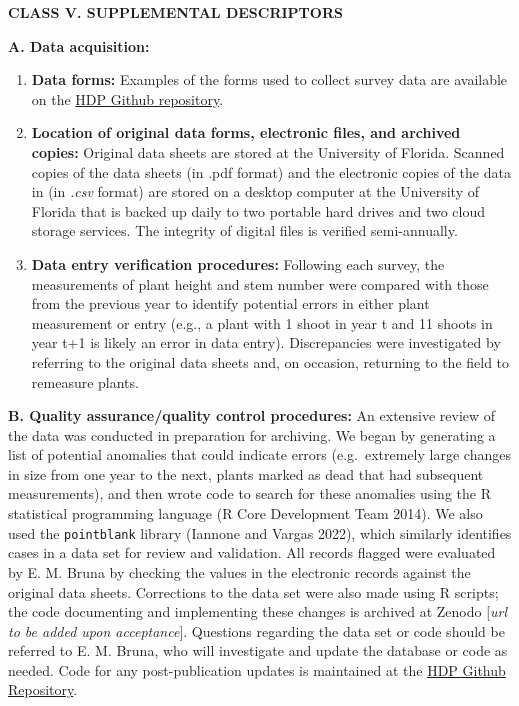 \documentclass[
  12pt,
  man, donotrepeattitle,floatsintext]{apa6}
\begin{document}
\noindent
\textbf{CLASS V. SUPPLEMENTAL DESCRIPTORS}

\noindent  
\textbf{A. Data acquisition:}

\begin{enumerate}
\def\labelenumi{\arabic{enumi}.}
\item
  \textbf{Data forms:} Examples of the forms used to collect survey data are available on the \href{https://github.com/BrunaLab/HeliconiaSurveys}{HDP Github repository}.
\item
  \textbf{Location of original data forms, electronic files, and archived copies:} Original data sheets are stored at the University of Florida. Scanned copies of the data sheets (in .pdf format) and the electronic copies of the data in (in \emph{.csv} format) are stored on a desktop computer at the University of Florida that is backed up daily to two portable hard drives and two cloud storage services. The integrity of digital files is verified semi-annually.
\item
  \textbf{Data entry verification procedures:} Following each survey, the measurements of plant height and stem number were compared with those from the previous year to identify potential errors in either plant measurement or entry (e.g., a plant with 1 shoot in year t and 11 shoots in year t+1 is likely an error in data entry). Discrepancies were investigated by referring to the original data sheets and, on occasion, returning to the field to remeasure plants.
\end{enumerate}

\noindent
\textbf{B. Quality assurance/quality control procedures:} An extensive review of the data was conducted in preparation for archiving. We began by generating a list of potential anomalies that could indicate errors (e.g.~extremely large changes in size from one year to the next, plants marked as dead that had subsequent measurements), and then wrote code to search for these anomalies using the R statistical programming language (R Core Development Team 2014). We also used the \texttt{pointblank} library (Iannone and Vargas 2022), which similarly identifies cases in a data set for review and validation. All records flagged were evaluated by E. M. Bruna by checking the values in the electronic records against the original data sheets. Corrections to the data set were also made using R scripts; the code documenting and implementing these changes is archived at Zenodo {[}\emph{url to be added upon acceptance}{]}. Questions regarding the data set or code should be referred to E. M. Bruna, who will investigate and update the database or code as needed. Code for any post-publication updates is maintained at the \href{https://github.com/BrunaLab/HeliconiaSurveys}{HDP Github Repository}.
\end{document}

